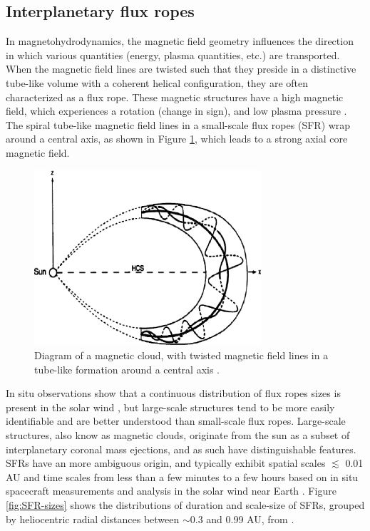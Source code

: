 

\subsection{Interplanetary flux ropes}
In magnetohydrodynamics, the magnetic field geometry influences the direction in which various quantities (energy, plasma quantities, etc.) are transported. When the magnetic field lines are twisted such that they preside in a distinctive tube-like volume with a coherent helical configuration, they are often characterized as a flux rope. These magnetic structures have a high magnetic field, which experiences a rotation (change in sign), and low plasma pressure \citep{Cartwright:2008}. The spiral tube-like magnetic field lines in a small-scale flux ropes (\gls{SFR}) wrap around a central axis, as shown in Figure \ref{fig:FR-diagram}, which leads to a strong axial core magnetic field.

\begin{figure}[ht!]
    \centering
    \includegraphics[width=0.75\textwidth]{Figures/fluxrope.png}
    \caption{Diagram of a magnetic cloud, with twisted magnetic field lines in a tube-like formation around a central axis \citep{Feng:2007}.}
    \label{fig:FR-diagram}
\end{figure}

In situ observations show that a continuous distribution of flux ropes sizes is present in the solar wind \citep{Feng:2007}, but large-scale structures tend to be more easily identifiable and are better understood than small-scale flux ropes. Large-scale structures, also know as magnetic clouds, originate from the sun as a subset of interplanetary coronal mass ejections, and as such have distinguishable features. SFRs have an more ambiguous origin, and typically exhibit spatial scales $\lesssim$ 0.01 AU and time scales from less than a few minutes to a few hours based on in situ spacecraft measurements and analysis in the solar wind near Earth \citep{Cartwright:2010, Feng:2007, Hu:2018}. Figure \ref{fig:SFR-sizes} shows the distributions of duration and scale-size of SFRs, grouped by heliocentric radial distances between $\sim$0.3 and 0.99 AU, from \cite{ChenHu:2020}.

